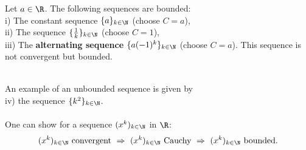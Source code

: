 \begin{frame}
\begin{ex}
	\blank 
	Let $a\in\R$. The following sequences are bounded:\\


		i) The constant sequence $\{a\}_{k\in\N}$ (choose $C = a$), \\
		
		ii) The sequence $\{\frac{1}{k}\}_{k\in\N}$ (choose $C = 1$),\\
		
		iii) The \textbf{alternating sequence} $\{a (-1)^k\}_{k\in\N}$ (choose $C=a$). This sequence is not convergent but bounded.

~\\
	An example of an unbounded sequence is given by\\
	
	iv) the sequence $\{k^2\}_{k\in\N}$. \\~\\
	One can show for a sequence $(x^k)_{k\in \N}$ in $\R$:
	$$(x^k)_{k\in \N}~\text{convergent}~\Rightarrow~(x^k)_{k\in \N}~\text{Cauchy}~\Rightarrow~(x^k)_{k\in \N}~\text{bounded}.$$
\end{ex}
\end{frame}

